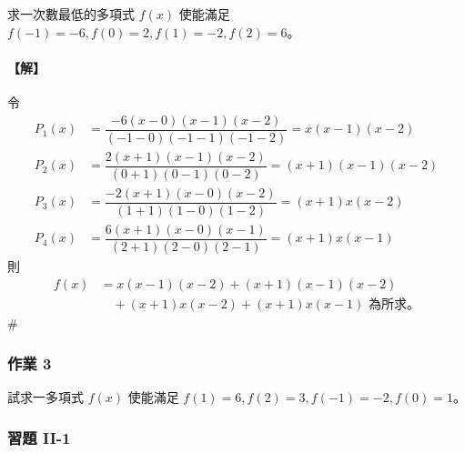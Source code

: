 \begin{example}\label{ex:b6-2-3}
求一次數最低的多項式 $f(x)$ 使能滿足 $f(-1)=-6, f(0)=2, f(1)=-2, f(2)=6$。
\end{example}

\paragraph{【解】}
令
\begin{align*}
P_1(x) &= \dfrac{-6(x-0)(x-1)(x-2)}{(-1-0)(-1-1)(-1-2)} = x(x-1)(x-2) \\
P_2(x) &= \dfrac{2(x+1)(x-1)(x-2)}{(0+1)(0-1)(0-2)} = (x+1)(x-1)(x-2) \\
P_3(x) &= \dfrac{-2(x+1)(x-0)(x-2)}{(1+1)(1-0)(1-2)} = (x+1)x(x-2) \\
P_4(x) &= \dfrac{6(x+1)(x-0)(x-1)}{(2+1)(2-0)(2-1)} = (x+1)x(x-1)
\end{align*}
則
\begin{align*}
f(x) &= x(x-1)(x-2) + (x+1)(x-1)(x-2) \\
&\quad + (x+1)x(x-2) + (x+1)x(x-1) \text{ 為所求。}
\end{align*}
\hfill$\#$

\subsubsection*{作業 3}\label{hw:b6-2-3}
試求一多項式 $f(x)$ 使能滿足 $f(1)=6, f(2)=3, f(-1)=-2, f(0)=1$。

\subsubsection*{習題 II-1}\label{sec:b6-ex2-1}

